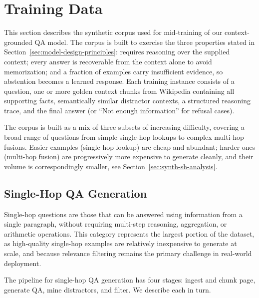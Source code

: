 \documentclass{llmxive}
\begin{document}
\section{Training Data}
\label{sec:training-data}

This section describes the synthetic corpus used for mid-training of our context-grounded QA model. The corpus is built to exercise the three properties stated in Section~\ref{sec:model-design-principles}: requires reasoning over the supplied context; every answer is recoverable from the context alone to avoid memorization; and a fraction of examples carry insufficient evidence, so abstention becomes a learned response. Each training instance consists of a question, one or more golden context chunks from Wikipedia containing all supporting facts, semantically similar distractor contexts, a structured reasoning trace, and the final answer (or ``Not enough information'' for refusal cases).

The corpus is built as a mix of three subsets of increasing difficulty, covering a broad range of questions from simple single-hop lookups to complex multi-hop fusions. Easier examples (single-hop lookup) are cheap and abundant; harder ones (multi-hop fusion) are progressively more expensive to generate cleanly, and their volume is correspondingly smaller, see Section~\ref{sec:synth-sh-analysis}. 

\subsection{Single-Hop QA Generation}
\label{sec:synth-singlehop}
Single-hop questions are those that can be answered using information from a single paragraph, without requiring multi-step reasoning, aggregation, or arithmetic operations. This category represents the largest portion of the dataset, as high-quality single-hop examples are relatively inexpensive to generate at scale, and because relevance filtering remains the primary challenge in real-world deployment.

The pipeline for single-hop QA generation has four stages: ingest and chunk page, generate QA, mine distractors, and filter. We describe each in turn.
\end{document}
